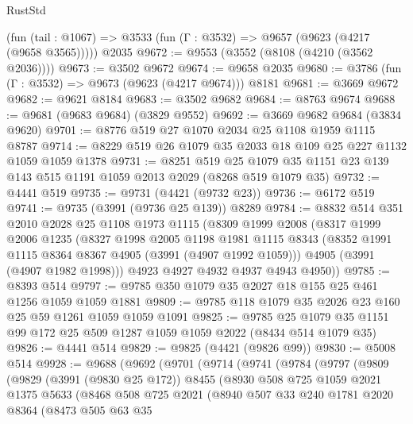 \begin{lexlean}{RustStd}
\begin{coremodule}
    (fun (tail : @1067) => @3533 (fun (Γ : @3532) => @9657 (@9623 (@4217 (@9658 @3565)))))
    @2035
@9672 := @9553 (@3552 (@8108 (@4210 (@3562 @2036))))
@9673 := @3502 @9672
@9674 := @9658 @2035
@9680 := @3786 (fun (Γ : @3532) => @9673 (@9623 (@4217 @9674))) @8181
@9681 := @3669 @9672
@9682 := @9621 @8184
@9683 := @3502 @9682
@9684 := @8763 @9674
@9688 := @9681 (@9683 @9684) (@3829 @9552)
@9692 := @3669 @9682 @9684 (@3834 @9620)
@9701 := @8776 @519 @27 @1070 @2034 @25 @1108 @1959 @1115 @8787
@9714 := @8229 @519 @26 @1079 @35 @2033 @18 @109 @25 @227 @1132 @1059 @1059 @1378
@9731 := @8251
    @519
    @25
    @1079
    @35
    @1151
    @23
    @139
    @143
    @515
    @1191
    @1059
    @2013
    @2029
    (@8268 @519 @1079 @35)
@9732 := @4441 @519
@9735 := @9731 (@4421 (@9732 @23))
@9736 := @6172 @519
@9741 := @9735 (@3991 (@9736 @25 @139)) @8289
@9784 := @8832
    @514
    @351
    @2010
    @2028
    @25
    @1108
    @1973
    @1115
    (@8309
      @1999
      @2008
      (@8317
        @1999
        @2006
        @1235
        (@8327
          @1998
          @2005
          @1198
          @1981
          @1115
          @8343
          (@8352 @1991 @1115 @8364 @8367 @4905 (@3991 (@4907 @1992 @1059)))
          @4905
          (@3991 (@4907 @1982 @1998)))
        @4923
        @4927
        @4932
        @4937
        @4943
        @4950))
@9785 := @8393 @514
@9797 := @9785 @350 @1079 @35 @2027 @18 @155 @25 @461 @1256 @1059 @1059 @1881
@9809 := @9785 @118 @1079 @35 @2026 @23 @160 @25 @59 @1261 @1059 @1059 @1091
@9825 := @9785 @25 @1079 @35 @1151 @99 @172 @25 @509 @1287 @1059 @1059 @2022 (@8434 @514 @1079 @35)
@9826 := @4441 @514
@9829 := @9825 (@4421 (@9826 @99))
@9830 := @5008 @514
@9928 := @9688
    (@9692
      (@9701
        (@9714
          (@9741
            (@9784
              (@9797
                (@9809
                  (@9829
                    (@3991 (@9830 @25 @172))
                    @8455
                    (@8930
                      @508
                      @725
                      @1059
                      @2021
                      @1375
                      @5633
                      (@8468
                        @508
                        @725
                        @2021
                        (@8940
                          @507
                          @33
                          @240
                          @1781
                          @2020
                          @8364
                          (@8473
                            @505
                            @63
                            @35

\end{coremodule}
\end{lexlean}
